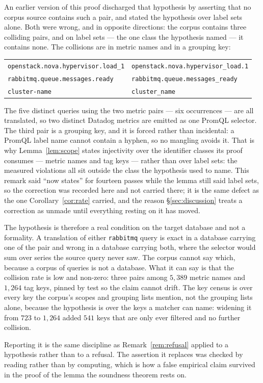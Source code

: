 \begin{remark}\label{rem:mangling}
An earlier version of this proof discharged that hypothesis by asserting that no corpus
source contains such a pair, and stated the hypothesis over label sets alone. Both were
wrong, and in opposite directions: the corpus contains three colliding pairs, and on
label sets --- the one class the hypothesis named --- it contains none. The collisions are
in metric names and in a grouping key:
\begin{center}\footnotesize
\begin{tabular}{@{}ll@{}}
\texttt{openstack.nova.hypervisor.load\_1} & \texttt{openstack.nova.hypervisor\_load.1}\\
\texttt{rabbitmq.queue.messages.ready} & \texttt{rabbitmq.queue.messages\_ready}\\
\texttt{cluster-name} & \texttt{cluster\_name}\\
\end{tabular}
\end{center}
The five distinct queries using the two metric pairs --- six occurrences --- are all
translated, so two distinct Datadog
metrics are emitted as one PromQL selector. The third pair is a grouping key, and it is
forced rather than incidental: a PromQL label name cannot contain a hyphen, so no
mangling avoids it. That is why Lemma~\ref{lem:scope} states injectivity over the
identifier classes its proof consumes --- metric names and tag keys --- rather than over
label sets: the measured violations all sit outside the class the hypothesis used to
name. This remark said ``now states'' for fourteen passes while the lemma still said
label sets, so the correction was recorded here and not carried there; it is the same
defect as the one Corollary~\ref{cor:rate} carried, and the reason \S\ref{sec:discussion}
treats a correction as unmade until everything resting on it has moved.

The hypothesis is therefore a real condition on the target database and not a formality.
A translation of either \texttt{rabbitmq} query is exact in a database carrying one of
the pair and wrong in a database carrying both, where the selector would sum over series
the source query never saw. The corpus cannot say which, because a corpus of queries is
not a database. What it can say is that the collision rate is low and non-zero: three
pairs among $5{,}389$ metric names and $1{,}264$ tag keys, pinned by test so the claim
cannot drift. The key census is over every key the corpus's scopes and grouping lists
mention, not the grouping lists alone, because the hypothesis is over the keys a matcher
can name: widening it from $723$ to $1{,}264$ added $541$ keys that are only ever
filtered and no further collision.

Reporting it is the same discipline as Remark~\ref{rem:refusal} applied to a hypothesis
rather than to a refusal. The assertion it replaces was checked by reading rather than by
computing, which is how a false empirical claim survived in the proof of the lemma the
soundness theorem rests on.
\end{remark}
